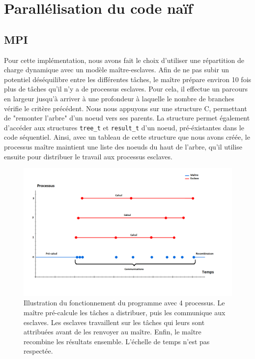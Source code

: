 \documentclass[12pt]{article}
\begin{document}


\section{Parallélisation du code naïf}
    \subsection{MPI}
    Pour cette implémentation, nous avons fait le choix d'utiliser une 
    répartition de charge dynamique avec un modèle maître-esclaves.
    Afin de ne pas subir un potentiel déséquilibre entre les différentes
    tâches, le maître prépare environ 10 fois plus de tâches qu'il n'y a
    de processus esclaves. Pour cela, il effectue un parcours en largeur
    jusqu'à arriver à une profondeur à laquelle le nombre de branches vérifie le
    critère précédent. Nous nous appuyons sur une structure C, permettant de
    "remonter l'arbre" d'un noeud vers ses parents. La structure permet
    également d'accéder aux structures \texttt{tree\_t} et \texttt{result\_t}
    d'un noeud, pré-éxistantes dans le code séquentiel.
    Ainsi, avec un tableau de cette structure que nous avons créée, le 
    processus maître maintient une liste des noeuds du haut de l'arbre,
    qu'il utilise ensuite pour distribuer le travail aux processus esclaves.\\
    \begin{figure}[t] \begin{center}
        \includegraphics[scale=0.33]{figures/time}
        \caption{\label{fig:time}Illustration du fonctionnement du programme
        avec 4 processus. Le maître pré-calcule les tâches a distribuer,
        puis les communique aux esclaves. Les esclaves travaillent sur les
        tâches qui leurs sont attribuées avant de les renvoyer au maître.
        Enfin, le maître recombine les résultats ensemble. L'échelle de temps 
        n'est pas respectée.}
    \end{center} \end{figure}
\end{document}
